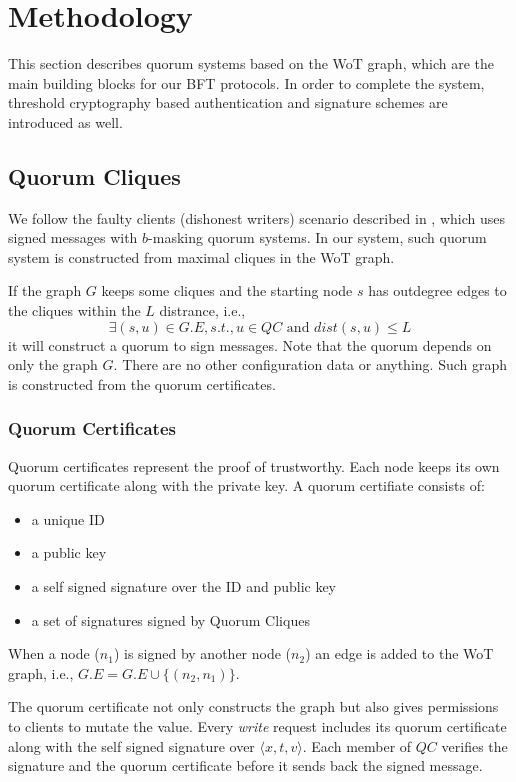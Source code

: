 \section{Methodology}
This section describes quorum systems based on the WoT graph, which
are the main building blocks for our BFT protocols. In order to
complete the system, threshold cryptography based authentication and
signature schemes are introduced as well.

\subsection{Quorum Cliques}
We follow the faulty clients (dishonest writers) scenario described in
\cite{Delhi:1,Delhi:2}, which uses signed messages with
$b$-masking quorum systems. In our system, such quorum system is
constructed from maximal cliques in the WoT graph.

If the graph $G$ keeps some cliques and the starting node $s$ has
outdegree edges to the cliques within the $L$ distrance, i.e.,
\[
\exists (s, u) \in G.E, s.t., u \in QC \text{ and } dist(s, u) \le L
\]
it will construct a quorum to sign messages. Note that the quorum
depends on only the graph $G$. There are no other configuration data
or anything.
Such graph is constructed from the quorum certificates. 

\subsubsection*{Quorum Certificates}
Quorum certificates represent the proof of trustworthy. Each node
keeps its own quorum certificate along with the private key. 
A quorum certifiate consists of:
\begin{itemize}
\item a unique ID
\item a public key
\item a self signed signature over the ID and public key
\item a set of signatures signed by Quorum Cliques
\end{itemize}
When a node ($n_1$) is signed by another node ($n_2$) an edge is added
to the WoT graph, i.e., $G.E = G.E \cup \{(n_2, n_1)\}$.

The quorum certificate not only constructs the graph but also gives
permissions to clients to mutate the value.
Every {\em write} request includes its quorum certificate along with the
self signed signature over $\langle x, t, v \rangle$. Each member of
$QC$ verifies the signature and the quorum certificate before it sends
back the signed message.

